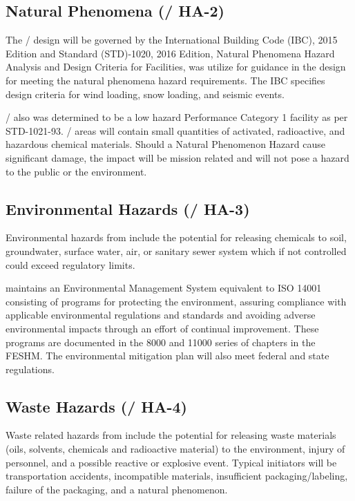 \subsection{Natural Phenomena (/ HA-2)}

The / design will be governed by the International Building
Code (IBC), 2015 Edition and  Standard (STD)-1020, 2016 Edition,
Natural Phenomena Hazard Analysis and Design Criteria for 
Facilities, was utilize for guidance in the design for meeting the
natural phenomena hazard requirements.  The IBC specifies design
criteria for wind loading, snow loading, and seismic events.

/ also was determined to be a low hazard Performance Category
1 facility as per  STD-1021-93. / areas will contain small
quantities of activated, radioactive, and hazardous chemical
materials. Should a Natural Phenomenon Hazard cause significant
damage, the impact will be mission related and will not pose a hazard
to the public or the environment.

\subsection{Environmental Hazards (/ HA-3)}

Environmental hazards from  include the potential for releasing
chemicals to soil, groundwater, surface water, air, or sanitary sewer
system which if not controlled could exceed regulatory limits.

\fnal maintains an Environmental Management System equivalent to
ISO 14001 consisting of programs for protecting the environment,
assuring compliance with applicable environmental regulations and
standards and avoiding adverse environmental impacts through an effort
of continual improvement.  These programs are documented in the 8000
and 11000 series of chapters in the FESHM.  The environmental
mitigation plan will also meet federal and state regulations.


\subsection{Waste Hazards (/ HA-4)}

Waste related hazards from  include the potential for releasing
waste materials (oils, solvents, chemicals and radioactive material)
to the environment, injury of personnel, and a possible reactive or
explosive event. Typical initiators will be transportation accidents,
incompatible materials, insufficient packaging/labeling, failure of
the packaging, and a natural phenomenon.

